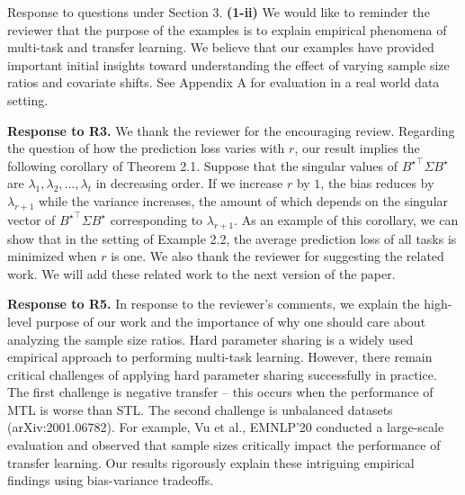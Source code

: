 \documentclass{article}
\begin{document}
	Response to questions under Section 3.
	\textbf{(1-ii)} We would like to reminder the reviewer that the purpose of the examples is to explain empirical phenomena of multi-task and transfer learning.
	We believe that our examples have provided important initial insights toward understanding the effect of varying sample size ratios and covariate shifts.
	See Appendix A for evaluation in a real world data setting.

	\textbf{Response to R3.}
	We thank the reviewer for the encouraging review.
	Regarding the question of how the prediction loss varies with $r$, our result implies the following corollary of Theorem 2.1.
	Suppose that the singular values of ${B^{\star}}^{\top}\Sigma B^{\star}$ are $\lambda_1, \lambda_2, \dots, \lambda_t$ in decreasing order.
	If we increase $r$ by $1$, the bias reduces by $\lambda_{r+1}$ while the variance increases, the amount of which depends on the singular vector of  ${B^{\star}}^{\top}\Sigma B^{\star}$ corresponding to $\lambda_{r+1}$.
	As an example of this corollary, we can show that in the setting of Example 2.2, the average prediction loss of all tasks is minimized when $r$ is one.
	We also thank the reviewer for suggesting the related work.
	We will add these related work to the next version of the paper.

	\textbf{Response to R5.}
	In response to the reviewer's comments, we explain the high-level purpose of our work and the importance of why one should care about analyzing the sample size ratios.
	Hard parameter sharing is a widely used empirical approach to performing multi-task learning.
	However, there remain critical challenges of applying hard parameter sharing successfully in practice.
	The first challenge is negative transfer -- this occurs when the performance of MTL is worse than STL.
	The second challenge is unbalanced datasets (arXiv:2001.06782).
	For example, Vu et al., EMNLP'20 conducted a large-scale evaluation and observed that sample sizes critically impact the performance of transfer learning.
	Our results rigorously explain these intriguing empirical findings using bias-variance tradeoffs.
\end{document}
